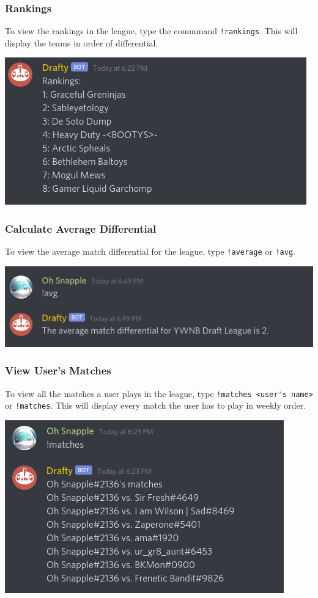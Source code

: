 \documentclass{article}
\begin{document}
\subsubsection*{Rankings}
To view the rankings in the league, type the commmand \verb|!rankings|. This will display the teams in order of differential.\\
\begin{center}
  \includegraphics[scale=.5]{rankings.png}
\end{center}
\subsubsection*{Calculate Average Differential}
To view the average match differential for the league, type \verb|!average| or \verb|!avg|.\\
\begin{center}
  \includegraphics[scale=.5]{avg.png}
\end{center}
\newpage
\subsubsection*{View User's Matches}
To view all the matches a user plays in the league, type \verb|!matches <user's name>| or \verb|!matches|. 
This will display every match the user has to play in weekly order.\\
\begin{center}
  \includegraphics[scale=.5]{matches.png}
\end{center}
\end{document}
